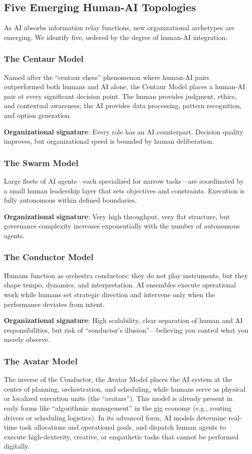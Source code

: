 \documentclass[11pt,a4paper,twocolumn]{article}
\begin{document}
\subsection{Five Emerging Human-AI Topologies}

As AI absorbs information relay functions, new organizational archetypes are emerging. We identify five, ordered by the degree of human-AI integration:

\subsubsection{The Centaur Model}
Named after the ``centaur chess'' phenomenon where human-AI pairs outperformed both humans and AI alone, the Centaur Model places a human-AI pair at every significant decision point. The human provides judgment, ethics, and contextual awareness; the AI provides data processing, pattern recognition, and option generation.

\textbf{Organizational signature}: Every role has an AI counterpart. Decision quality improves, but organizational speed is bounded by human deliberation.

\subsubsection{The Swarm Model}
Large fleets of AI agents---each specialized for narrow tasks---are coordinated by a small human leadership layer that sets objectives and constraints. Execution is fully autonomous within defined boundaries.

\textbf{Organizational signature}: Very high throughput, very flat structure, but governance complexity increases exponentially with the number of autonomous agents.

\subsubsection{The Conductor Model}
Humans function as orchestra conductors: they do not play instruments, but they shape tempo, dynamics, and interpretation. AI ensembles execute operational work while humans set strategic direction and intervene only when the performance deviates from intent.

\textbf{Organizational signature}: High scalability, clear separation of human and AI responsibilities, but risk of ``conductor's illusion''---believing you control what you merely observe.

\subsubsection{The Avatar Model}
The inverse of the Conductor, the Avatar Model places the AI system at the center of planning, orchestration, and scheduling, while humans serve as physical or localized execution units (the ``avatars''). This model is already present in early forms like ``algorithmic management'' in the gig economy (e.g., routing drivers or scheduling logistics). In its advanced form, AI models determine real-time task allocations and operational goals, and dispatch human agents to execute high-dexterity, creative, or empathetic tasks that cannot be performed digitally.
\end{document}
